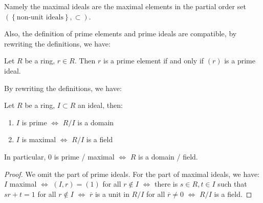 \documentclass{note-eng}
\begin{document}
Namely the maximal ideals are the maximal elements in the partial order set $(\left\lbrace \text{non-unit ideals} \right\rbrace, \subset)$.

Also, the definition of prime elements and prime ideals are compatible, by rewriting the definitions, we have:

\begin{proposition}\label{porp:prime-element-prime-ideal}
    Let $R$ be a ring, $r \in R$. Then $r$ is a prime element if and only if $(r)$ is a prime ideal.
\end{proposition}

\iffalse
\begin{definition}[Spectrum]
    Let $R$ be a ring, define
    $$
        \begin{aligned}
        \mathrm{Spec}(R) &= \left\lbrace I \subset R: \text{$I$ is a prime ideal} \right\rbrace \\
        \mathrm{MSpec}(R) &= \left\lbrace I \subset R: \text{$I$ is a maximal ideal} \right\rbrace
        \end{aligned}
    $$
    and call $\mathrm{Spec}(R)$ the \textbf{prime spectrum} and $\mathrm{MSpec}(R)$ the \textbf{maximal spectrum} of the ring.
\end{definition}

For now, the spectrums are merely sets. But we will see later that we can define a topology (Zariski's topology) on it.
\fi

By rewriting the definitions, we have:

\begin{proposition} \label{prop:test-prime-maximal}
    Let $R$ be a ring, $I \subset R$ an ideal, then:
    \begin{enumerate}
        \item $I$ is prime $\Leftrightarrow$ $R / I$ is a domain
        \item $I$ is maximal $\Leftrightarrow$ $R / I$ is a field
    \end{enumerate}
    In particular, $0$ is prime / maximal $\Leftrightarrow$ $R$ is a domain / field.
\end{proposition}

\begin{proof}
    We omit the part of prime ideals. For the part of maximal ideals, we have: $I$ maximal $\Leftrightarrow$ $(I, r) = (1)$ for all $r \notin I$ $\Leftrightarrow$ there is $s \in R, t \in I$ such that $sr + t = 1$ for all $r \notin I$ $\Leftrightarrow$ $\overline{r}$ is a unit in $R / I$ for all $\overline{r} \ne 0$ $\Leftrightarrow$ $R / I$ is a field.
\end{proof}
\end{document}

